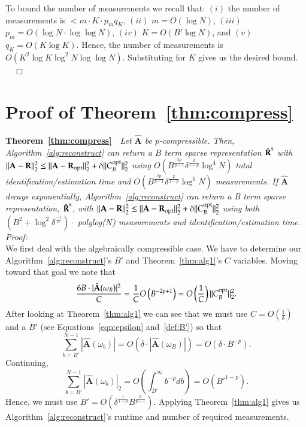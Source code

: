 \documentclass{article}
\begin{document}
To bound the number of measurements we recall that: $(i)$ the number of measurements is $< m \cdot K \cdot p_{m}q_{K}$, $(ii)$ $m = O(\log N)$, $(iii)$ $p_{m} = O(\log N \cdot \log\log N)$, $(iv)$ $K = O( B' \log N)$, and $(v)$ $q_{K} = O(K \log K)$. Hence, the number of measurements is $O \left( K^{2} \log K \log^{2} N \log \log N \right)$.  Substituting for $K$ gives us the desired bound.
~~$\Box$ \\

\section{Proof of Theorem~\ref{thm:compress}}

\noindent \textbf{Theorem~\ref{thm:compress}}~~\textit{Let $\hat{\textbf{A}}$ be $p$-compressible.  Then, Algorithm~\ref{alg:reconstruct} can return a $B$ term sparse representation $\hat{\textbf{R}}^{\rm s}$ with $\| \textbf{A} - \textbf{R}\|^{2}_{2} \leq \| \textbf{A} - \textbf{R}_{\rm opt} \|^{2}_{2} + \delta \| C^{\rm opt}_{B} \|^{2}_{2}$ using $O \left( B^{\frac{2p}{p-1}} \delta^{\frac{2}{1-p}} \log^{4} N \right)$ total identification/estimation time and $O \left( B^{\frac{2p}{p-1}} \delta^{\frac{2}{1-p}} \log^{6} N \right)$ measurements.  If $\hat{\textbf{A}}$ decays exponentially, Algorithm~\ref{alg:reconstruct} can return a B term sparse representation, $\hat{\textbf{R}}^{\rm s}$, with $\| \textbf{A} - \textbf{R}\|^{2}_{2} \leq \| \textbf{A} - \textbf{R}_{\rm opt} \|^{2}_{2} + \delta \| C^{\rm opt}_{B} \|^{2}_{2}$ using both $\left( B^{2} + \log^{2} \delta^{\frac{-1}{\alpha}} \right) \cdot$ polylog($N$) measurements and identification/estimation time.}\\

\noindent \textit{Proof:} \\

We first deal with the algebraically compressible case.  We have to determine our Algorithm~\ref{alg:reconstruct}'s $B'$ and Theorem~\ref{thm:alg1}'s $C$ variables.  Moving toward that goal we note that
$$\frac{6 B \cdot |\hat{\textbf{A}}(\omega_{B})|^{2}}{C} = \frac{1}{C}O \left( B^{-2p+1} \right) = O \left( \frac{1}{C} \right) \| C^{\rm opt}_{B} \|^{2}_{2}.$$
After looking at Theorem~\ref{thm:alg1} we can see that we must use $C = O \left( \frac{1}{\delta} \right)$ and a $B'$ (see Equations~\ref{eqn:epsilon} and~\ref{def:B'}) so that
$$\sum^{N-1}_{b=B'} | \hat{\textbf{A}}(\omega_{b}) | = O(\delta \cdot |\hat{\textbf{A}}(\omega_{B})|) = O( \delta \cdot B^{-p} ).$$
Continuing,
$$\sum^{N-1}_{b = B'} |\hat{\textbf{A}}(\omega_{b})|_{2} = O \left( \int^{\infty}_{B'} b^{-p} db \right) = O( B'^{1-p} ).$$
Hence, we must use $B' = O \left( \delta^{\frac{1}{1-p}} B^{\frac{p}{p-1}} \right)$.  Applying Theorem~\ref{thm:alg1} gives us Algorithm~\ref{alg:reconstruct}'s runtime and number of required measurements.
\end{document}
